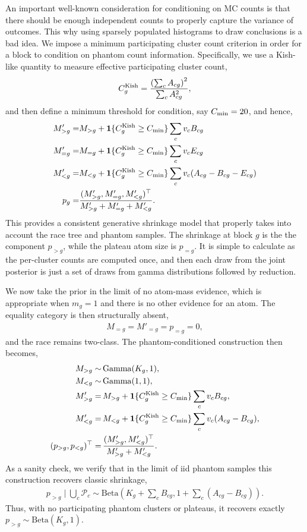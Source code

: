 \documentclass[pdflatex,sn-basic,icol]{sn-jnl}
\theoremstyle{plain}
\theoremstyle{definition}
\begin{document}
An important well-known consideration for conditioning on MC counts is that there should be enough independent counts to properly capture the variance of outcomes.
This why using sparsely populated histograms to draw conclusions is a bad idea.
We impose a minimum participating cluster count criterion in order for a block to condition on phantom count information.
Specifically, we use a Kish-like quantity to measure effective participating cluster count,
\begin{align}
    C^{\rm Kish}_g = \frac{\left(\sum_c A_{cg}\right)^2}{\sum_c A_{cg}^2},
\end{align}
and then define a minimum threshold for condition, say $C_{\rm min} = 20$, and hence,
\begin{align}
    M'_{>g} =& M_{>g} + \mathbf{1}\{C^{\rm Kish}_g \ge C_{\rm min}\} \sum_c v_c B_{cg}\\
    M'_{=g} =& M_{=g} + \mathbf{1}\{C^{\rm Kish}_g \ge C_{\rm min}\} \sum_c v_c E_{cg}\\
    M'_{<g} =& M_{<g} + \mathbf{1}\{C^{\rm Kish}_g \ge C_{\rm min}\} \sum_c v_c (A_{cg} - B_{cg} - E_{cg})\\
    p_g =& \frac{(M'_{>g}, M'_{=g}, M'_{<g})^\top}{M'_{>g} + M'_{=g} + M'_{<g}}.
\end{align}
This provides a consistent generative shrinkage model that properly takes into account the race tree and phantom samples.
The shrinkage at block $g$ is the the component $p_{>g}$, while the plateau atom size is $p_{=g}$.
It is simple to calculate as the per-cluster counts are computed once, and then each draw from the joint posterior is just a set of draws from gamma distributions followed by reduction.

We now take the prior in the limit of no atom-mass evidence, which is appropriate when $m_g=1$ and there is no other evidence for an atom.
The equality category is then structurally absent,
\begin{align}
    M_{=g} = M'_{=g} = p_{=g} = 0,
\end{align}
and the race remains two-class.
The phantom-conditioned construction then becomes,
\begin{align}
    M_{>g} \sim&\, \mathrm{Gamma}(K_g, 1),\\
    M_{<g} \sim&\, \mathrm{Gamma}(1, 1),\\
    M'_{>g} =&\, M_{>g} + \mathbf{1}\{C^{\rm Kish}_g \ge C_{\rm min}\} \sum_c v_c B_{cg},\\
    M'_{<g} =&\, M_{<g} + \mathbf{1}\{C^{\rm Kish}_g \ge C_{\rm min}\} \sum_c v_c (A_{cg} - B_{cg}),\\
    (p_{>g},p_{<g})^\top =&\, \frac{(M'_{>g}, M'_{<g})^\top}{M'_{>g} + M'_{<g}}.
\end{align}
As a sanity check, we verify that in the limit of iid phantom samples this construction recovers classic shrinkage,
\begin{align}
    p_{>g} \mid \bigcup_c \mathcal{P}_c
    \sim \mathrm{Beta}\left(
        K_g + \sum_c B_{cg},
        1 + \sum_c (A_{cg} - B_{cg})
    \right).
\end{align}
Thus, with no participating phantom clusters or plateaus, it recovers exactly $p_{>g}\sim\mathrm{Beta}(K_g,1)$.
\end{document}
